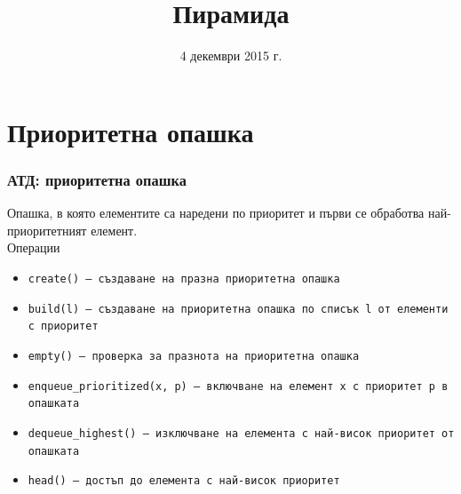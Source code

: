 \documentclass{beamer}
\title{Пирамида}
\date{4 декември 2015 г.}
\begin{document}
\begin{frame}
  \titlepage
\end{frame}

\section{Приоритетна опашка}

\begin{frame}
  \frametitle{АТД: приоритетна опашка}
  
  Опашка, в която елементите са наредени по приоритет и първи се обработва най-приоритетният елемент.\\[1em]
  Операции
  \vspace{0.5em}
  \begin{itemize}
  \item \tt{create()} --- създаване на празна приоритетна опашка
  \item \tt{build(l)} --- създаване на приоритетна опашка по списък \tt l от елементи с приоритет
  \item \tt{empty()} --- проверка за празнота на приоритетна опашка
  \item \tt{enqueue\_prioritized(x, p)} --- включване на елемент \tt x с приоритет \tt p в опашката
  \item \tt{dequeue\_highest()} --- изключване на елемента с най-висок приоритет от опашката
  \item \tt{head()} --- достъп до елемента с най-висок приоритет
  \end{itemize}
\end{frame}
\end{document}
